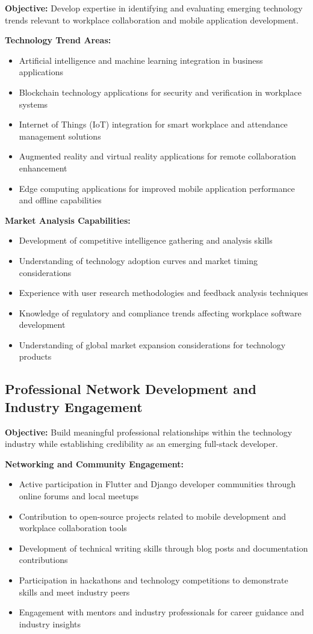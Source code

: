 \textbf{Objective:} Develop expertise in identifying and evaluating emerging technology trends relevant to workplace collaboration and mobile application development.

\textbf{Technology Trend Areas:}
\begin{itemize}
    \item Artificial intelligence and machine learning integration in business applications
    \item Blockchain technology applications for security and verification in workplace systems
    \item Internet of Things (IoT) integration for smart workplace and attendance management solutions
    \item Augmented reality and virtual reality applications for remote collaboration enhancement
    \item Edge computing applications for improved mobile application performance and offline capabilities
\end{itemize}

\textbf{Market Analysis Capabilities:}
\begin{itemize}
    \item Development of competitive intelligence gathering and analysis skills
    \item Understanding of technology adoption curves and market timing considerations
    \item Experience with user research methodologies and feedback analysis techniques
    \item Knowledge of regulatory and compliance trends affecting workplace software development
    \item Understanding of global market expansion considerations for technology products
\end{itemize}

\subsection{Professional Network Development and Industry Engagement}

\textbf{Objective:} Build meaningful professional relationships within the technology industry while establishing credibility as an emerging full-stack developer.

\textbf{Networking and Community Engagement:}
\begin{itemize}
    \item Active participation in Flutter and Django developer communities through online forums and local meetups
    \item Contribution to open-source projects related to mobile development and workplace collaboration tools
    \item Development of technical writing skills through blog posts and documentation contributions
    \item Participation in hackathons and technology competitions to demonstrate skills and meet industry peers
    \item Engagement with mentors and industry professionals for career guidance and industry insights
\end{itemize}

